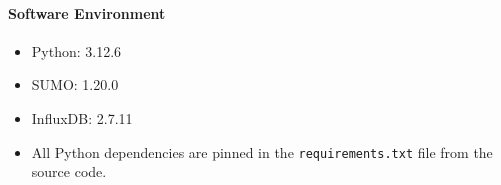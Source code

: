 \paragraph{Software Environment}
\begin{itemize}
  \item Python: 3.12.6
  \item SUMO: 1.20.0
  \item InfluxDB: 2.7.11
  \item All Python dependencies are pinned in the \texttt{requirements.txt} file from the source code.
\end{itemize}


